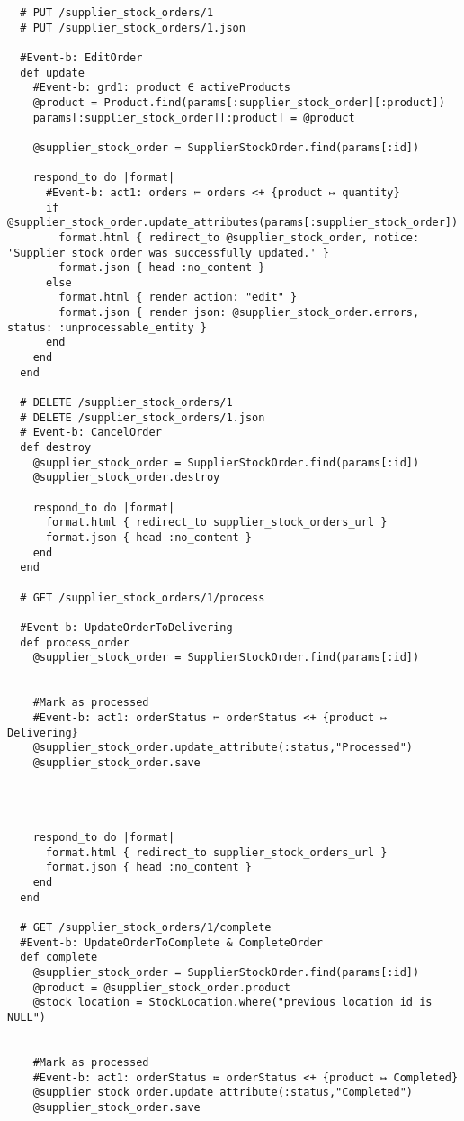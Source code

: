 \documentclass[a4paper]{article}
\begin{document}
\begin{verbatim}
  # PUT /supplier_stock_orders/1
  # PUT /supplier_stock_orders/1.json

  #Event-b: EditOrder
  def update
    #Event-b: grd1: product ∈ activeProducts
    @product = Product.find(params[:supplier_stock_order][:product])
    params[:supplier_stock_order][:product] = @product

    @supplier_stock_order = SupplierStockOrder.find(params[:id])

    respond_to do |format|
      #Event-b: act1: orders ≔ orders <+ {product ↦ quantity}
      if @supplier_stock_order.update_attributes(params[:supplier_stock_order])
        format.html { redirect_to @supplier_stock_order, notice: 'Supplier stock order was successfully updated.' }
        format.json { head :no_content }
      else
        format.html { render action: "edit" }
        format.json { render json: @supplier_stock_order.errors, status: :unprocessable_entity }
      end
    end
  end

  # DELETE /supplier_stock_orders/1
  # DELETE /supplier_stock_orders/1.json
  # Event-b: CancelOrder
  def destroy
    @supplier_stock_order = SupplierStockOrder.find(params[:id])
    @supplier_stock_order.destroy

    respond_to do |format|
      format.html { redirect_to supplier_stock_orders_url }
      format.json { head :no_content }
    end
  end

  # GET /supplier_stock_orders/1/process

  #Event-b: UpdateOrderToDelivering
  def process_order
    @supplier_stock_order = SupplierStockOrder.find(params[:id])


    #Mark as processed
    #Event-b: act1: orderStatus ≔ orderStatus <+ {product ↦ Delivering}
    @supplier_stock_order.update_attribute(:status,"Processed")
    @supplier_stock_order.save

 


    respond_to do |format|
      format.html { redirect_to supplier_stock_orders_url }
      format.json { head :no_content }
    end
  end

  # GET /supplier_stock_orders/1/complete
  #Event-b: UpdateOrderToComplete & CompleteOrder
  def complete
    @supplier_stock_order = SupplierStockOrder.find(params[:id])
    @product = @supplier_stock_order.product
    @stock_location = StockLocation.where("previous_location_id is NULL")


    #Mark as processed
    #Event-b: act1: orderStatus ≔ orderStatus <+ {product ↦ Completed}
    @supplier_stock_order.update_attribute(:status,"Completed")
    @supplier_stock_order.save


\end{verbatim}
\end{document}
